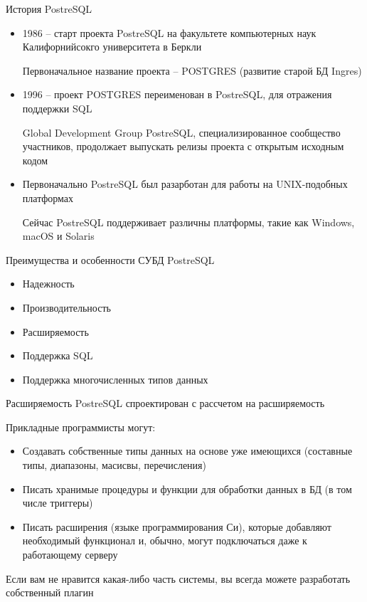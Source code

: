 \documentclass[12pt]{article}
\begin{document}
\begin{nota}{История PostreSQL}
    \begin{itemize}
        \item 1986 -- старт проекта PostreSQL на факультете компьютерных наук Калифорнийсокго университета в Беркли
        
        Первоначальное название проекта -- POSTGRES (развитие старой БД Ingres)

        \item 1996 -- проект POSTGRES переименован в PostreSQL, для отражения поддержки SQL
        
        Global Development Group PostreSQL, специализированное сообщество участников, продолжает выпускать релизы проекта с открытым исходным кодом 

        \item Первоначально PostreSQL был разарботан для работы на UNIX-подобных платформах
        
        Сейчас PostreSQL поддерживает различны платформы, такие как Windows, macOS и Solaris
    \end{itemize}
\end{nota}

\begin{nota}{Преимущества и особенности СУБД PostreSQL}
    \begin{itemize}
        \item Надежность
        \item Производительность
        \item Расширяемость
        \item Поддержка SQL
        \item Поддержка многочисленных типов данных
    \end{itemize}
\end{nota}

\begin{nota}{Расширяемость}
    PostreSQL спроектирован с рассчетом на расширяемость 

    Прикладные программисты могут:

    \begin{itemize}
        \item Создавать собственные типы данных на основе уже имеющихся (составные типы, диапазоны, масисвы, перечисления)
        \item Писать хранимые процедуры и функции для обработки данных в БД (в том числе триггеры)
        \item Писать расширения (языке программирования Си), которые добавляют необходимый функционал и, обычно, могут подключаться даже к работающему серверу
    \end{itemize}

    Если вам не нравится какая-либо часть системы, вы всегда можете разработать собственный плагин
\end{nota}
\end{document}
